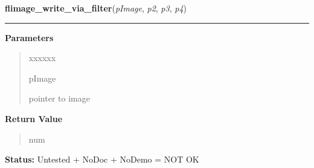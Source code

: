 \hspace{.8\funcindent}\begin{boxedminipage}{\funcwidth}

    \raggedright \textbf{flimage\_write\_via\_filter}(\textit{pImage}, \textit{p2}, \textit{p3}, \textit{p4})

    \vspace{-1.5ex}

    \rule{\textwidth}{0.5\fboxrule}
\setlength{\parskip}{2ex}
\setlength{\parskip}{1ex}
      \textbf{Parameters}
      \vspace{-1ex}

      \begin{quote}
        \begin{Ventry}{xxxxxx}

          \item[pImage]

          pointer to image

        \end{Ventry}

      \end{quote}

      \textbf{Return Value}
    \vspace{-1ex}

      \begin{quote}
      num

      \end{quote}

\textbf{Status:} Untested + NoDoc + NoDemo = NOT OK



    \end{boxedminipage}

    \label{xformslib:library:flimage_free}

    \vspace{0.5ex}


